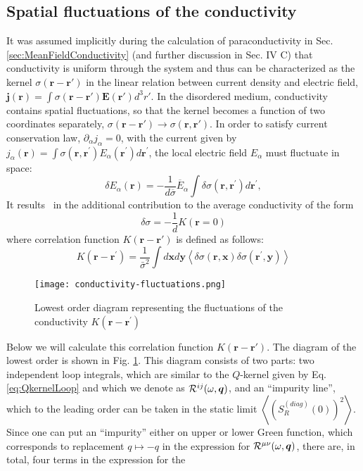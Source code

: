 \documentclass[twocolumn,english,prb]{revtex4-1}
\begin{document}
\subsection{Spatial fluctuations of the conductivity}
\label{sec:ConductivityFluctuations}


 It was assumed implicitly  during the calculation of paraconductivity in Sec.\ref{sec:MeanFieldConductivity}  (and further discussion in Sec. IV C)
 that  conductivity is uniform through the system and thus can be characterized
as the kernel $\sigma(\boldsymbol{r}-\boldsymbol{r'})$ in the linear relation between current density and electric field,
$\boldsymbol{j}(\boldsymbol{r}) = \int  \sigma(\boldsymbol{r}-\boldsymbol{r'}) \boldsymbol{E}(\boldsymbol{r'}) d^3r' $. 
In the disordered medium, conductivity   contains spatial fluctuations, so that the kernel becomes a function of two
coordinates separately, $\sigma(\boldsymbol{r}-\boldsymbol{r'}) \to \sigma(\boldsymbol{r}, \boldsymbol{r'})$.
In order to satisfy current conservation law, $\partial_{\alpha} j_\alpha = 0$, 
with the current given by $j_{\alpha}(\boldsymbol{r})=
\int\sigma(\boldsymbol{r},\boldsymbol{r}^{\prime})E_{\alpha}(\boldsymbol{r}^{\prime})d\boldsymbol{r}^{\prime}$,
the local electric field $E_\alpha$ must fluctuate in space:
\begin{equation}
\delta E_{\alpha}(\boldsymbol{r})=-\frac{1}{d\overline{\sigma}}\overline{E}_{\alpha}\int\delta
\sigma(\boldsymbol{r},\boldsymbol{r}^{\prime})d\boldsymbol{r}^{\prime},
\end{equation}
It results~\cite{LandauLifshits} in the additional
contribution to the average conductivity of the form
$$\delta\sigma = -\frac{1}{d} K(\textbf{r} = 0)$$
where correlation function $K(\boldsymbol{r}- \boldsymbol{r'})$ is defined as follows:
\begin{equation}
\label{Kdef}
K(\boldsymbol{r}-\boldsymbol{r}^{\prime})=\frac{1}{\bar{\sigma}^{2}}\int d\boldsymbol{x}d\boldsymbol{y}\left\langle \delta\sigma(\boldsymbol{r},\boldsymbol{x})\delta\sigma(\boldsymbol{r}^\prime,\boldsymbol{y})\right\rangle 
\end{equation}
\begin{figure}
	\centering
	\texttt{[image: conductivity-fluctuations.png]}
	\caption{Lowest order diagram representing the fluctuations of the conductivity $K(\boldsymbol{r}-\boldsymbol{r}^\prime)$}
	\label{fig:ConductivityFluctuations}
\end{figure}
Below we will calculate this correlation function $K(\boldsymbol{r}- \boldsymbol{r'})$.  The diagram of  the lowest order is shown in Fig. \ref{fig:ConductivityFluctuations}. This  diagram consists of two parts: two independent loop integrals, which are similar to the $Q$-kernel given by Eq. \eqref{eq:QkernelLoop} and which we denote as ${\cal R}^{i j}(\omega,\boldsymbol{q})$, and an ``impurity line'', which to the leading order can be taken in the static limit $\left\langle (S_{R}^{(diag)}(0))^{2}\right\rangle$. Since one can put an ``impurity'' either on upper or lower Green function, which corresponds to replacement $q \mapsto -q$ in the expression for ${\cal R}^{\mu \nu}(\omega,\boldsymbol{q})$, there are, in total, four terms in the expression for the
\end{document}
